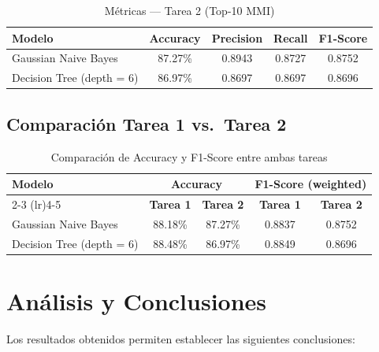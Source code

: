\documentclass[12pt, letterpaper]{article}
\begin{document}
\begin{table}[H]
    \centering
    \caption{Métricas — Tarea 2 (Top-10 MMI)}
    \label{tab:tarea2}
    \begin{tabular}{lcccc}
        \toprule
        \textbf{Modelo} & \textbf{Accuracy} & \textbf{Precision} &
        \textbf{Recall} & \textbf{F1-Score} \\
        \midrule
        \rowcolor{rowgray}
        Gaussian Naive Bayes       & 87.27\% & 0.8943 & 0.8727 & 0.8752 \\
        Decision Tree (depth = 6)  & 86.97\% & 0.8697 & 0.8697 & 0.8696 \\
        \bottomrule
    \end{tabular}
\end{table}

\subsection{Comparación Tarea 1 vs.\ Tarea 2}

\begin{table}[H]
    \centering
    \caption{Comparación de Accuracy y F1-Score entre ambas tareas}
    \label{tab:comparacion}
    \begin{tabular}{lcccc}
        \toprule
        \multirow{2}{*}{\textbf{Modelo}} &
        \multicolumn{2}{c}{\textbf{Accuracy}} &
        \multicolumn{2}{c}{\textbf{F1-Score (weighted)}} \\
        \cmidrule(lr){2-3} \cmidrule(lr){4-5}
        & \textbf{Tarea 1} & \textbf{Tarea 2} &
          \textbf{Tarea 1} & \textbf{Tarea 2} \\
        \midrule
        \rowcolor{rowgray}
        Gaussian Naive Bayes      & 88.18\% & 87.27\% & 0.8837 & 0.8752 \\
        Decision Tree (depth = 6) & 88.48\% & 86.97\% & 0.8849 & 0.8696 \\
        \bottomrule
    \end{tabular}
\end{table}

\section{Análisis y Conclusiones}

Los resultados obtenidos permiten establecer las siguientes conclusiones:
\end{document}
